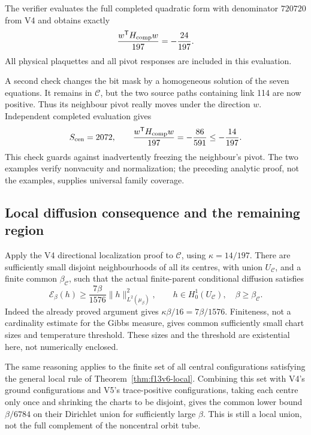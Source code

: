 \documentclass[11pt,oneside]{article}
\newcommand{\E}{\mathcal E}
\begin{document}
The verifier evaluates the full completed
quadratic form with denominator \(720720\)
from V4 and obtains exactly
\[
 \frac{w^{\mathsf T}H_{\rm comp}w}{197}
       =-\frac{24}{197}.
\]
All physical plaquettes and all pivot
responses are included in this evaluation.

A second check changes the bit mask by a
homogeneous solution of the seven equations.
It remains in \(\mathcal C\), but the two
source paths containing link 114 are now
positive. Thus its neighbour pivot really
moves under the direction \(w\). Independent
completed evaluation gives
\[
 S_{\rm cen}=2072,\qquad
 \frac{w^{\mathsf T}H_{\rm comp}w}{197}
       =-\frac{86}{591}
       \le-\frac{14}{197}.
\]
This check guards against inadvertently
freezing the neighbour's pivot. The two
examples verify nonvacuity and normalization;
the preceding analytic proof, not the
examples, supplies universal family coverage.

\subsection{Local diffusion consequence and the remaining region}

Apply the V4 directional localization proof
to \(\mathcal C\), using
\(\kappa=14/197\). There are sufficiently
small disjoint neighbourhoods of all its
centres, with union \(U_{\mathcal C}\), and
a finite common \(\beta_{\mathcal C}\), such
that the actual finite-parent conditional
diffusion satisfies
\begin{equation}\label{eq:f13v6-dirichlet}
 \E_\beta(h)\ge\frac{7\beta}{1576}
                  \|h\|_{L^2(\mu_\beta)}^2,
 \qquad h\in H_0^1(U_{\mathcal C}),\quad
 \beta\ge\beta_{\mathcal C}.
\end{equation}
Indeed the already proved argument gives
\(\kappa\beta/16=7\beta/1576\).
Finiteness, not a cardinality estimate for
the Gibbs measure, gives common sufficiently
small chart sizes and temperature threshold.
These sizes and the threshold are existential
here, not numerically enclosed.

The same reasoning applies to the finite
set of all central configurations satisfying
the general local rule of
Theorem~\ref{thm:f13v6-local}. Combining this
set with V4's ground configurations and
V5's trace-positive configurations, taking
each centre only once and shrinking the
charts to be disjoint, gives the common
lower bound \(\beta/6784\) on their Dirichlet
union for sufficiently large \(\beta\).
This is still a local union, not the full
complement of the noncentral orbit tube.
\end{document}
